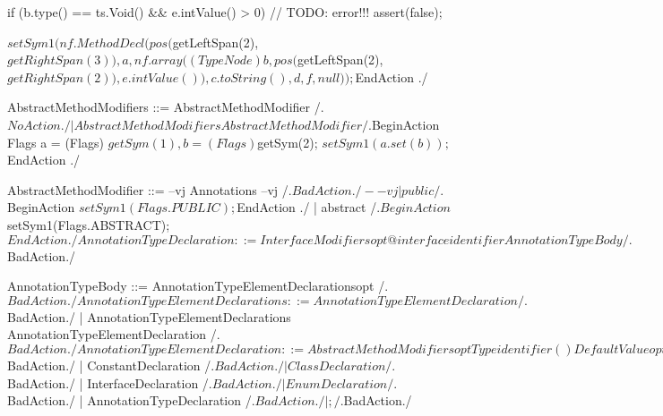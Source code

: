                     if (b.type() == ts.Void() && e.intValue() > 0)
                    {
                        // TODO: error!!!
                        assert(false);
                    }

                    $setSym1(nf.MethodDecl(pos($getLeftSpan(2), $getRightSpan(3)),
                                           a,
                                           nf.array((TypeNode) b, pos($getLeftSpan(2), $getRightSpan(2)), e.intValue()),
                                           c.toString(),
                                           d,
                                           f,
                                           null));
          $EndAction
        ./
    
    AbstractMethodModifiers ::= AbstractMethodModifier
        /.$NoAction./
                              | AbstractMethodModifiers AbstractMethodModifier
        /.$BeginAction
                    Flags a = (Flags) $getSym(1),
                          b = (Flags) $getSym(2);
                    $setSym1(a.set(b));
          $EndAction
        ./
    
    AbstractMethodModifier ::= 
--vj Annotations
--vj        /.$BadAction./
--vj                             | 
                               public
        /.$BeginAction
                    $setSym1(Flags.PUBLIC);
          $EndAction
        ./
                             | abstract
        /.$BeginAction
                    $setSym1(Flags.ABSTRACT);
          $EndAction
        ./
    
    AnnotationTypeDeclaration ::= InterfaceModifiersopt @ interface identifier AnnotationTypeBody
        /.$BadAction./
    
    AnnotationTypeBody ::= { AnnotationTypeElementDeclarationsopt }
        /.$BadAction./
    
    AnnotationTypeElementDeclarations ::= AnnotationTypeElementDeclaration
        /.$BadAction./
                                        | AnnotationTypeElementDeclarations AnnotationTypeElementDeclaration
        /.$BadAction./
    
    AnnotationTypeElementDeclaration ::= AbstractMethodModifiersopt Type identifier ( ) DefaultValueopt ;
        /.$BadAction./
                                       | ConstantDeclaration
        /.$BadAction./
                                       | ClassDeclaration
        /.$BadAction./
                                       | InterfaceDeclaration
        /.$BadAction./
                                       | EnumDeclaration
        /.$BadAction./
                                       | AnnotationTypeDeclaration
        /.$BadAction./
                                       | ;
        /.$BadAction./
    
